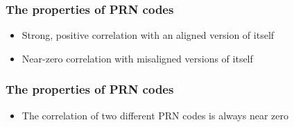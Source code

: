 \documentclass[aspectratio=169]{beamer}
\begin{document}
\begin{frame}
  \frametitle{The properties of PRN codes}

  \begin{itemize}
    \item<2-> Strong, positive correlation with an aligned version of itself
    
    \item<3-> Near-zero correlation with misaligned versions of itself
  \end{itemize}

  \vspace{0.5em}

  \centering
\end{frame}

\begin{frame}
  \frametitle{The properties of PRN codes}

  \begin{itemize}
    \item<2-> The correlation of two different PRN codes is always near zero
  \end{itemize}

  \vspace{0.5em}

  \centering
\end{frame}
\end{document}

